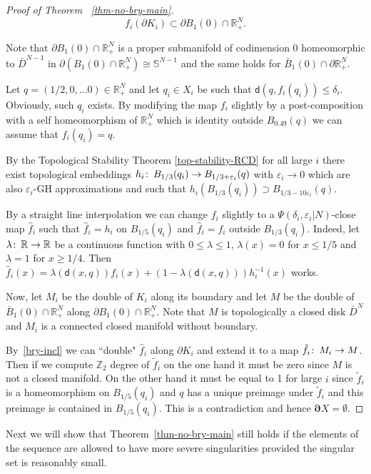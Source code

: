 \documentclass[a4paper]{amsart}
\newcounter{assu}
\theoremstyle{plain}
\theoremstyle{definition}
\numberwithin{equation}{section}
\newcommand{\R}{\mathbb{R}}
\newcommand{\Z}{\mathbb{Z}}
\newcommand{\sfd}{\mathsf d}
\newcommand{\eps}{\varepsilon}
\def\co{\colon\thinspace}
\newcommand{\Ss}{\mathbb S}
\newcommand{\bRCD}{\boldsymbol\partial}
\begin{document}
{{\begin{proof}[Proof of Theorem ~\ref{thm-no-bry-main}]
\begin{equation}\label{bry-incl}
f_i(\partial K_i)\subset \partial B_1(0)\cap \R^N_+.
\end{equation}

Note that $\partial B_1(0)\cap \R^N_+$ is a proper submanifold of codimension 0 homeomorphic to $\bar D^{N-1}$ in $\partial (B_1(0)\cap \R^N_+)\cong \Ss^{N-1}$ and the same holds for $\bar B_1(0)\cap \partial \R^N_+$.

Let $q=(1/2,0,\ldots 0)\in \R^N_+$ and let $q_i\in X_i$ be such that $\sfd(q, f_i(q_i))\le \delta_i$. Obviously, such $q_i$ exists. By modifying the map $f_i$ slightly by a post-composition with a self homeomorphism of $\R^N_+$ which is identity outside $B_{0.49}(q)$  we can assume that $f_i(q_i)=q$.

By the Topological Stability Theorem \ref{top-stability-RCD} for all large $i$ there exist topological embeddings $h_i\co B_{1/3}(q_i)\to B_{1/3+\eps_i}(q)$ with $\eps_i\to 0$ which are also $\eps_i$-GH approximations and such that $h_i(B_{1/3}(q_i))\supset B_{1/3-10\eps_i}(q)$.


By a straight line interpolation we can change $f_i$ slightly  to a $\Psi(\delta_i,\eps_i|N)$-close map $\hat f_i$ such that $\hat f_i=h_i$ on $B_{1/5}(q_i)$ and $\hat f_i=f_i$ outside $B_{1/3}(q_i)$. Indeed, let $\lambda\co\R\to \R$ be a continuous function with $0\le\lambda\le 1$, 
$\lambda(x)=0$ for $x\le 1/5$ and $\lambda=1$ for $x\ge 1/4$. Then  $\hat f_i(x)=\lambda (\sfd(x,q))f_i(x)+(1-\lambda (\sfd(x,q)))h_i^{-1}(x)$ works.

Now, let $M_i$ be the double of $K_i$ along its boundary and let $M$ be the double of $ \bar B_1(0)\cap \R^N_+$ along $\partial B_1(0)\cap \R^N_+$. Note that $M$ is topologically a closed disk $\bar D^N$ and $M_i$ is a connected closed manifold without boundary.

By~\eqref{bry-incl} we can ``double"  $\hat f_i$ along $\partial K_i$ and extend it to a map $\tilde f_i\co M_i\to M$. Then if we compute $\Z_2$ degree of $\tilde f_i$ on the one hand it must be zero since $M$ is not a closed manifold. On the other hand it must be equal to 1 for large $i$ since $\tilde f_i$ is a homeomorphism on $B_{1/5}(q_i)$ and $q$ has a unique preimage under $\tilde f_i$ and this preimage is contained in $B_{1/5}(q_i)$. This is a contradiction and hence $\bRCD X=\emptyset$.
\end{proof}




Next we will show that  Theorem~\ref{thm-no-bry-main}  still holds if the elements of the sequence are allowed to have more severe singularities provided the singular set is reasonably small.

}}
\end{document}
